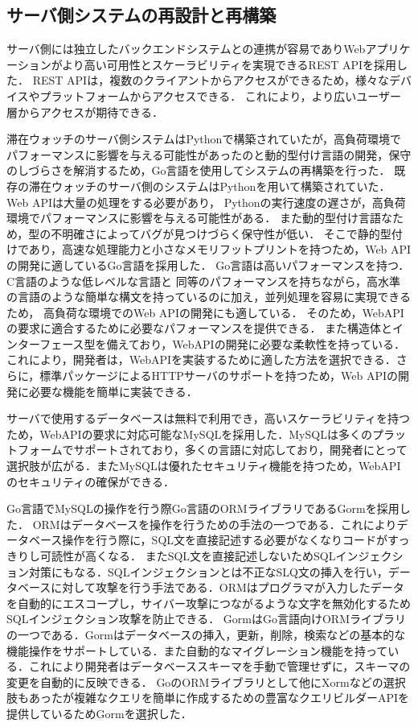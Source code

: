



\subsection{サーバ側システムの再設計と再構築}\label{4.1.1}
サーバ側には独立したバックエンドシステムとの連携が容易でありWebアプリケーションがより高い可用性とスケーラビリティを実現できるREST APIを採用した．
REST APIは，複数のクライアントからアクセスができるため，様々なデバイスやプラットフォームからアクセスできる．
これにより，より広いユーザー層からアクセスが期待できる．


滞在ウォッチのサーバ側システムはPythonで構築されていたが，高負荷環境でパフォーマンスに影響を与える可能性があったのと動的型付け言語の開発，保守のしづらさを解消するため，Go言語を使用してシステムの再構築を行った．
既存の滞在ウォッチのサーバ側のシステムはPythonを用いて構築されていた．Web APIは大量の処理をする必要があり，
Pythonの実行速度の遅さが，高負荷環境でパフォーマンスに影響を与える可能性がある．
また動的型付け言語なため，型の不明確さによってバグが見つけづらく保守性が低い．
そこで静的型付けであり，高速な処理能力と小さなメモリフットプリントを持つため，Web APIの開発に適しているGo言語を採用した．
Go言語は高いパフォーマンスを持つ．C言語のような低レベルな言語と
同等のパフォーマンスを持ちながら，高水準の言語のような簡単な構文を持っているのに加え，並列処理を容易に実現できるため，
高負荷な環境でのWeb APIの開発にも適している．
そのため，WebAPIの要求に適合するために必要なパフォーマンスを提供できる．
また構造体とインターフェース型を備えており，WebAPIの開発に必要な柔軟性を持っている．これにより，開発者は，WebAPIを実装するために適した方法を選択できる．さらに，標準パッケージによるHTTPサーバのサポートを持つため，Web APIの開発に必要な機能を簡単に実装できる．

サーバで使用するデータベースは無料で利用でき，高いスケーラビリティを持つため，WebAPIの要求に対応可能なMySQLを採用した．MySQLは多くのプラットフォームでサポートされており，多くの言語に対応しており，開発者にとって選択肢が広がる．またMySQLは優れたセキュリティ機能を持つため，WebAPIのセキュリティの確保ができる．

Go言語でMySQLの操作を行う際Go言語のORMライブラリであるGormを採用した．
ORMはデータベースを操作を行うための手法の一つである．これによりデータベース操作を行う際に，SQL文を直接記述する必要がなくなりコードがすっきりし可読性が高くなる．
またSQL文を直接記述しないためSQLインジェクション対策にもなる．SQLインジェクションとは不正なSLQ文の挿入を行い，データベースに対して攻撃を行う手法である．ORMはプログラマが入力したデータを自動的にエスコープし，サイバー攻撃につながるような文字を無効化するためSQLインジェクション攻撃を防止できる．
GormはGo言語向けORMライブラリの一つである．Gormはデータベースの挿入，更新，削除，検索などの基本的な機能操作をサポートしている．また自動的なマイグレーション機能を持っている．これにより開発者はデータベーススキーマを手動で管理せずに，スキーマの変更を自動的に反映できる．
GoのORMライブラリとして他にXormなどの選択肢もあったが複雑なクエリを簡単に作成するための豊富なクエリビルダーAPIを提供しているためGormを選択した．


